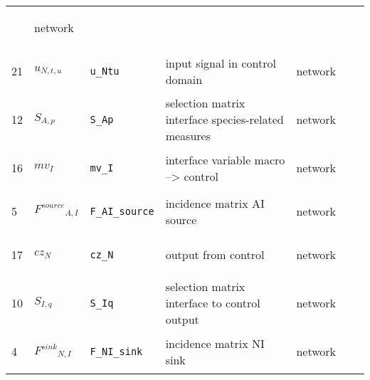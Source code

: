 \begin{longtable}{|p{1cm}|p{2.5cm}|p{4.5cm}|p{8cm}|p{3.0cm}|p{3cm}|p{1cm}|}
             & \begin{lay}network \end{lay}
             & $  $
             & \\
            21
             & \hypertarget{"v:21"}{ $ {{u}}{_{N, t, u}} $}
             & \verb|u_Ntu|
             & input signal in control domain
             & \begin{lay}network \end{lay}
             & $  $
             & \\
            12
             & \hypertarget{"v:12"}{ $ {{S}}{_{A, p}} $}
             & \verb|S_Ap|
             & selection matrix interface species-related measures
             & \begin{lay}network \end{lay}
             & $  $
             & \\
            16
             & \hypertarget{"v:16"}{ $ {{mv}}{_{I}} $}
             & \verb|mv_I|
             & interface variable macro --> control
             & \begin{lay}network \end{lay}
             & $  $
             & \\
            5
             & \hypertarget{"v:5"}{ $ {{F^{source}}}{_{A, I}} $}
             & \verb|F_AI_source|
             & incidence matrix AI source
             & \begin{lay}network \end{lay}
             & $  $
             & \\
            17
             & \hypertarget{"v:17"}{ $ {{cz}}{_{N}} $}
             & \verb|cz_N|
             & output from control
             & \begin{lay}network \end{lay}
             & $  $
             & \\
            10
             & \hypertarget{"v:10"}{ $ {{S}}{_{I, q}} $}
             & \verb|S_Iq|
             & selection matrix interface to control output
             & \begin{lay}network \end{lay}
             & $  $
             & \\
            4
             & \hypertarget{"v:4"}{ $ {{F^{sink}}}{_{N, I}} $}
             & \verb|F_NI_sink|
             & incidence matrix NI sink
             & \begin{lay}network \end{lay}
             & $  $

\end{longtable}
